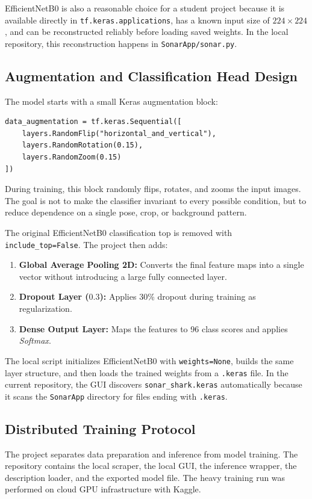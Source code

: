 \documentclass[11pt,a4paper,oneside]{article}
\begin{document}
EfficientNetB0 is also a reasonable choice for a student project because it is available directly in \texttt{tf.keras.applications}, has a known input size of $224 \times 224$, and can be reconstructed reliably before loading saved weights. In the local repository, this reconstruction happens in \texttt{SonarApp/sonar.py}.

\subsection{Augmentation and Classification Head Design}
The model starts with a small Keras augmentation block:
\begin{lstlisting}
data_augmentation = tf.keras.Sequential([
    layers.RandomFlip("horizontal_and_vertical"),
    layers.RandomRotation(0.15),
    layers.RandomZoom(0.15)
])
\end{lstlisting}
During training, this block randomly flips, rotates, and zooms the input images. The goal is not to make the classifier invariant to every possible condition, but to reduce dependence on a single pose, crop, or background pattern.

The original EfficientNetB0 classification top is removed with \texttt{include\_top=False}. The project then adds:
\begin{enumerate}
    \item \textbf{Global Average Pooling 2D:} Converts the final feature maps into a single vector without introducing a large fully connected layer.
    \item \textbf{Dropout Layer ($\mathbf{0.3}$):} Applies 30\% dropout during training as regularization.
    \item \textbf{Dense Output Layer:} Maps the features to 96 class scores and applies \textit{Softmax}.
\end{enumerate}

The local script initializes EfficientNetB0 with \texttt{weights=None}, builds the same layer structure, and then loads the trained weights from a \texttt{.keras} file. In the current repository, the GUI discovers \texttt{sonar\_shark.keras} automatically because it scans the \texttt{SonarApp} directory for files ending with \texttt{.keras}.

\subsection{Distributed Training Protocol}
The project separates data preparation and inference from model training. The repository contains the local scraper, the local GUI, the inference wrapper, the description loader, and the exported model file. The heavy training run was performed on cloud GPU infrastructure with Kaggle.
\end{document}
